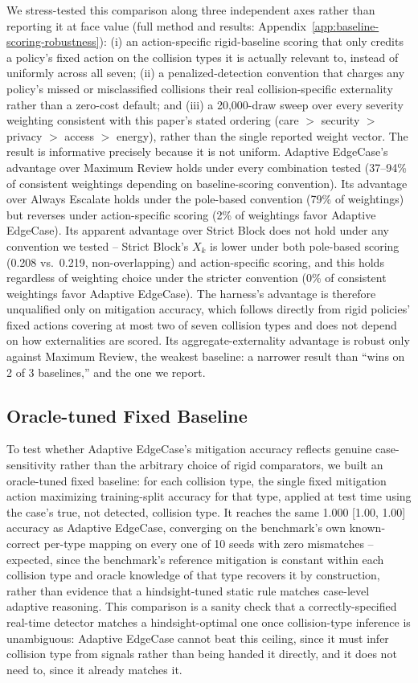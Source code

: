 \documentclass[letterpaper]{article} %
\begin{document}
We stress-tested this comparison along three independent axes rather than reporting it at face value (full method and results: Appendix~\ref{app:baseline-scoring-robustness}): (i) an action-specific rigid-baseline scoring that only credits a policy's fixed action on the collision types it is actually relevant to, instead of uniformly across all seven; (ii) a penalized-detection convention that charges any policy's missed or misclassified collisions their real collision-specific externality rather than a zero-cost default; and (iii) a 20,000-draw sweep over every severity weighting consistent with this paper's stated ordering (care $>$ security $>$ privacy $>$ access $>$ energy), rather than the single reported weight vector. The result is informative precisely because it is not uniform. Adaptive EdgeCase's advantage over Maximum Review holds under every combination tested (37--94\% of consistent weightings depending on baseline-scoring convention). Its advantage over Always Escalate holds under the pole-based convention (79\% of weightings) but reverses under action-specific scoring (2\% of weightings favor Adaptive EdgeCase). Its apparent advantage over Strict Block does not hold under any convention we tested -- Strict Block's $X_k$ is lower under both pole-based scoring (0.208 vs.\ 0.219, non-overlapping) and action-specific scoring, and this holds regardless of weighting choice under the stricter convention (0\% of consistent weightings favor Adaptive EdgeCase). The harness's advantage is therefore unqualified only on mitigation accuracy, which follows directly from rigid policies' fixed actions covering at most two of seven collision types and does not depend on how externalities are scored. Its aggregate-externality advantage is robust only against Maximum Review, the weakest baseline: a narrower result than ``wins on 2 of 3 baselines,'' and the one we report.

\subsection{Oracle-tuned Fixed Baseline}
To test whether Adaptive EdgeCase's mitigation accuracy reflects genuine case-sensitivity rather than the arbitrary choice of rigid comparators, we built an oracle-tuned fixed baseline: for each collision type, the single fixed mitigation action maximizing training-split accuracy for that type, applied at test time using the case's true, not detected, collision type. It reaches the same 1.000 [1.00, 1.00] accuracy as Adaptive EdgeCase, converging on the benchmark's own known-correct per-type mapping on every one of 10 seeds with zero mismatches -- expected, since the benchmark's reference mitigation is constant within each collision type and oracle knowledge of that type recovers it by construction, rather than evidence that a hindsight-tuned static rule matches case-level adaptive reasoning. This comparison is a sanity check that a correctly-specified real-time detector matches a hindsight-optimal one once collision-type inference is unambiguous: Adaptive EdgeCase cannot beat this ceiling, since it must infer collision type from signals rather than being handed it directly, and it does not need to, since it already matches it.
\end{document}
